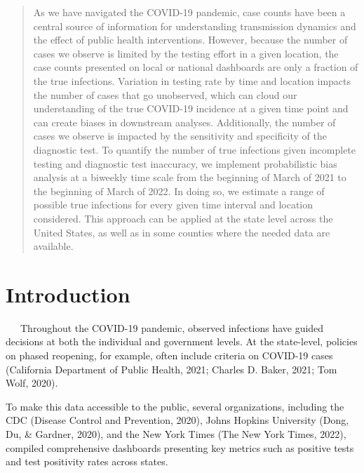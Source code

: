 \documentclass[12pt,twoside]{smiththesis}
\begin{document}
  {
    \hypersetup{linkcolor=black}
    \setcounter{tocdepth}{2}
    \tableofcontents
  }


  \begin{abstract}
    As we have navigated the COVID-19 pandemic, case counts have been a central source of information for understanding transmission dynamics and the effect of public health interventions. However, because the number of cases we observe is limited by the testing effort in a given location, the case counts presented on local or national dashboards are only a fraction of the true infections. Variation in testing rate by time and location impacts the number of cases that go unobserved, which can cloud our understanding of the true COVID-19 incidence at a given time point and can create biases in downstream analyses. Additionally, the number of cases we observe is impacted by the sensitivity and specificity of the diagnostic test. To quantify the number of true infections given incomplete testing and diagnostic test inaccuracy, we implement probabilistic bias analysis at a biweekly time scale from the beginning of March of 2021 to the beginning of March of 2022. In doing so, we estimate a range of possible true infections for every given time interval and location considered. This approach can be applied at the state level across the United States, as well as in some counties where the needed data are available.
  \end{abstract}

\mainmatter %
\pagestyle{fancyplain} %

\hypertarget{introduction}{%
\chapter{Introduction}\label{introduction}}

~~~Throughout the COVID-19 pandemic, observed infections have guided decisions at both the individual and government levels. At the state-level, policies on phased reopening, for example, often include criteria on COVID-19 cases (California Department of Public Health, 2021; Charles D. Baker, 2021; Tom Wolf, 2020).

To make this data accessible to the public, several organizations, including the CDC (Disease Control and Prevention, 2020), Johns Hopkins University (Dong, Du, \& Gardner, 2020), and the New York Times (The New York Times, 2022), compiled comprehensive dashboards presenting key metrics such as positive tests and test positivity rates across states.
\end{document}
